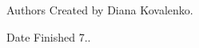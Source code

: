 \begin{DoxyAuthor}{Authors}
Created by Diana Kovalenko. 
\end{DoxyAuthor}
\begin{DoxyDate}{Date}
Finished 7.. 
\end{DoxyDate}
